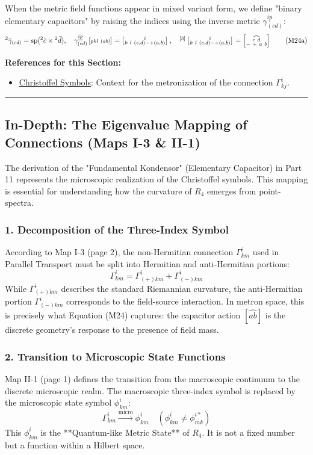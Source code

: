 \documentclass[11pt,a4paper,oneside]{article}
\DeclareMathOperator{\spn}{sp}
\newcommand{\metroncap}[4][]{%
    \left[ \renewcommand{\arraystretch}{0.85} \substack{#2 \\ #3 \ #4} \right]_{#1}%
}
\newenvironment{sectionrefs}
  {\par\vspace{1em}\noindent\textbf{\textsf{References for this Section:}}\begin{itemize}[leftmargin=*, label={\scriptsize$\blacksquare$}, itemsep=2pt]}
  {\end{itemize}}
\newcommand{\hr}{\par\vspace{2em}\noindent\rule{\linewidth}{0.4pt}\par\vspace{2em}}
\begin{document}
When the metric field functions appear in mixed variant form, we define "binary elementary capacitors" by raising the indices using the inverse metric $\gamma_{(cd)}^{\underline{ip}}$:
\begin{equation}
    {}^2\bar{\gamma}_{(cd)} = \spn({}^2\bar{c} \times {}^2\bar{d}), \quad \gamma_{(cd)}^{\underline{ip}}\metroncap{ }{pkl}{(ab)} = \metroncap{i}{k\ l}{(c,d) - + (a,b)}, \quad {}^{[3]} \metroncap{i}{k\ l}{(c,d) - + (a,b)} = \metroncap{\widehat{c \ d}}{- \ +}{a \ b} \tag{M24a}
\end{equation}

\begin{sectionrefs}
    \item \href{https://en.wikipedia.org/wiki/Christoffel_symbols}{Christoffel Symbols}: Context for the metronization of the connection $\Gamma^i_{kj}$.
\end{sectionrefs}

\hr

\subsection*{In-Depth: The Eigenvalue Mapping of Connections (Maps I-3 \& II-1)}

The derivation of the "Fundamental Kondensor" (Elementary Capacitor) in Part 11 represents the microscopic realization of the Christoffel symbols. This mapping is essential for understanding how the curvature of $R_4$ emerges from point-spectra.

\subsubsection*{1. Decomposition of the Three-Index Symbol}
According to Map I-3 (page 2), the non-Hermitian connection $\Gamma_{km}^i$ used in Parallel Transport must be split into Hermitian and anti-Hermitian portions:
\begin{equation}
    \Gamma_{km}^i = \Gamma_{(+)km}^i + \Gamma_{(-)km}^i
\end{equation}
While $\Gamma_{(+)km}^i$ describes the standard Riemannian curvature, the anti-Hermitian portion $\Gamma_{(-)km}^i$ corresponds to the field-source interaction. In metron space, this is precisely what Equation (M24) captures: the capacitor action $[\widehat{ab}]$ is the discrete geometry's response to the presence of field mass.

\subsubsection*{2. Transition to Microscopic State Functions}
Map II-1 (page 1) defines the transition from the macroscopic continuum to the discrete microscopic realm. The macroscopic three-index symbol is replaced by the microscopic state symbol $\phi_{km}^i$:
\begin{equation}
    \Gamma_{km}^i \xrightarrow{\text{micro}} \phi_{km}^i \quad (\phi_{km}^i \neq \phi_{mk}^{i*})
\end{equation}
This $\phi_{km}^i$ is the **Quantum-like Metric State** of $R_4$. It is not a fixed number but a function within a Hilbert space.
\end{document}
